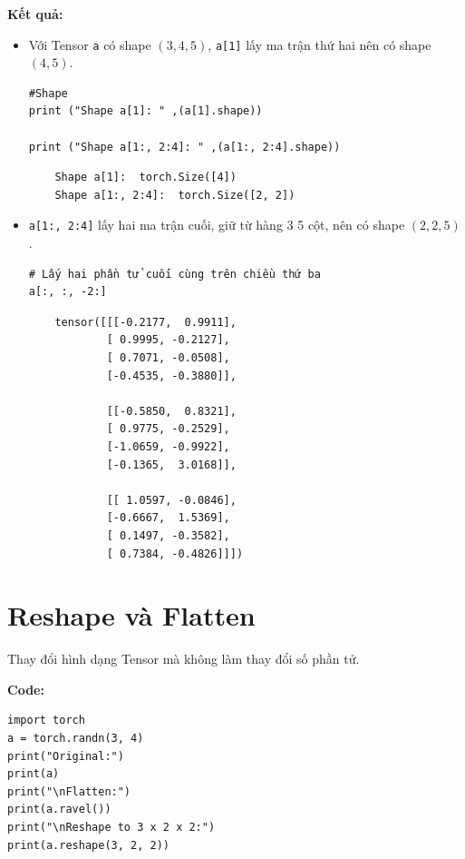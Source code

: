 \documentclass[12pt,a4paper]{article}
\begin{document}
\textbf{Kết quả:}
\begin{itemize}
    \item Với Tensor \texttt{a} có shape $(3,4,5)$, \texttt{a[1]} lấy ma trận thứ hai nên có shape $(4,5)$.

        \begin{verbatim}
#Shape
print ("Shape a[1]: " ,(a[1].shape))

print ("Shape a[1:, 2:4]: " ,(a[1:, 2:4].shape))
    \end{verbatim}

    \begin{verbatim}
    Shape a[1]:  torch.Size([4])
    Shape a[1:, 2:4]:  torch.Size([2, 2])
    \end{verbatim}

    \item \texttt{a[1:, 2:4]} lấy hai ma trận cuối, giữ từ hàng 3  5 cột, nên có shape $(2,2,5)$.
    \begin{verbatim}
# Lấy hai phần tử cuối cùng trên chiều thứ ba
a[:, :, -2:]
\end{verbatim}

    \begin{verbatim}
    tensor([[[-0.2177,  0.9911],
            [ 0.9995, -0.2127],
            [ 0.7071, -0.0508],
            [-0.4535, -0.3880]],

            [[-0.5850,  0.8321],
            [ 0.9775, -0.2529],
            [-1.0659, -0.9922],
            [-0.1365,  3.0168]],

            [[ 1.0597, -0.0846],
            [-0.6667,  1.5369],
            [ 0.1497, -0.3582],
            [ 0.7384, -0.4826]]])
    \end{verbatim}

\end{itemize}







\section{Reshape và Flatten}
Thay đổi hình dạng Tensor mà không làm thay đổi số phần tử.

\textbf{Code:}
\begin{verbatim}
import torch
a = torch.randn(3, 4)
print("Original:")
print(a)
print("\nFlatten:")
print(a.ravel())
print("\nReshape to 3 x 2 x 2:")
print(a.reshape(3, 2, 2))
\end{verbatim}
\end{document}
